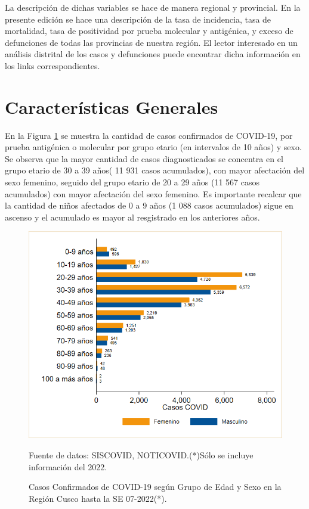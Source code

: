 \documentclass[12pt,a4paper,openany]{book}
\begin{document}
	La descripción de dichas variables se hace de manera regional y provincial. En la presente edición se hace una descripción de la tasa de incidencia, tasa de mortalidad, tasa de positividad por prueba molecular y antigénica, y exceso de defunciones de todas las provincias de nuestra región. El lector interesado en un análisis distrital de los casos y defunciones puede encontrar dicha información en los links correspondientes.
	 
	
	\clearpage	
	\section*{Características Generales}
	
	
	
 	\noindent En la Figura \ref{fig:casos_edad_sexo} se muestra la cantidad de casos confirmados de COVID-19, por prueba antigénica o molecular por grupo etario (en intervalos de 10 años) y sexo. Se observa que la mayor cantidad de casos diagnosticados se concentra en el grupo etario de 30 a 39 años( 11 931  casos acumulados), con mayor afectación del sexo femenino, seguido del grupo etario de 20 a 29 años (11 567 casos acumulados) con mayor afectación del sexo femenino. Es importante recalcar que la cantidad de niños afectados de 0 a 9 años (1 088 casos acumulados) sigue en ascenso y el acumulado es mayor al resgistrado en los anteriores años.  
 	
 	
\begin{figure}[h]
	\caption{Casos Confirmados de COVID-19 según Grupo de Edad y Sexo en la Región Cusco hasta la SE 07-2022(*).}\label{fig:casos_edad_sexo}
	\begin{center}
		\includegraphics[width=0.75\linewidth]{../figuras/casos_etapavida_2022}
	\end{center}
	{\footnotesize {Fuente de datos: SISCOVID, NOTICOVID.(*)Sólo se incluye información del 2022.}}
\end{figure}
\pagebreak
\end{document}
